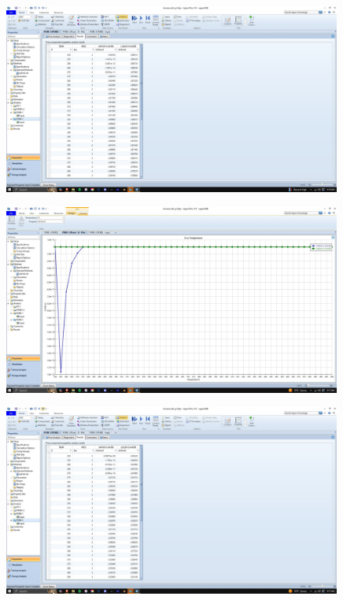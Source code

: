 \documentclass{article}
\begin{document}
\begin{figure}[H]
    \centering
    \includegraphics[width=0.99\textwidth, frame]{img/7 (h2bar table).JPG}
\end{figure}

\begin{figure}[H]
    \centering
    \includegraphics[width=0.99\textwidth, frame]{img/8 (ggraph2bar).JPG}
\end{figure}

\begin{figure}[H]
    \centering
    \includegraphics[width=0.99\textwidth, frame]{img/9 (gtable2bar).JPG}
\end{figure}
\end{document}
